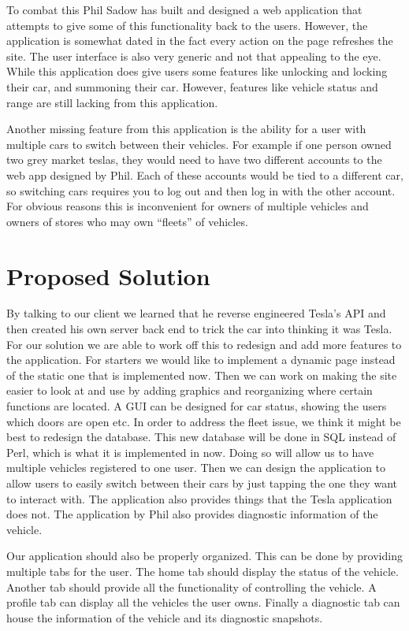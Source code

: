 \documentclass[draftclsnofoot, onecolumn, compsoc, 10pt]{IEEEtran}
\begin{document}
To combat this Phil Sadow has built and designed a web application that attempts to give some of this functionality back to the users. However, the application is somewhat dated in the fact every action on the page refreshes the site. The user interface is also very generic and not that appealing to the eye. While this application does give users some features like unlocking and locking their car, and summoning their car. However, features like vehicle status and range are still lacking from this application. 

Another missing feature from this application is the ability for a user with multiple cars to switch between their vehicles. For example if one person owned two grey market teslas, they would need to have two different accounts to the web app designed by Phil. Each of these accounts would be tied to a different car, so switching cars requires you to log out and then log in with the other account. For obvious reasons this is inconvenient for owners of multiple vehicles and owners of stores who may own “fleets” of vehicles.  
   
 
 \section{Proposed Solution} 
By talking to our client we learned that he reverse engineered Tesla’s API and then created his own server back end to trick the car into thinking it was Tesla. For our solution we are able to work off this to redesign and add more features to the application. For starters we would like to implement a dynamic page instead of the static one that is implemented now. Then we can work on making the site easier to look at and use by adding graphics and reorganizing where certain functions are located. A GUI can be designed for car status, showing the users which doors are open etc. In order to address the fleet issue, we think it might be best to redesign the database. This new database will be done in SQL instead of Perl, which is what it is implemented in now. Doing so will allow us to have multiple vehicles registered to one user. Then we can design the application to allow users to easily switch between their cars by just tapping the one they want to interact with. The application also provides things that the Tesla application does not. The application by Phil also provides diagnostic information of the vehicle.

Our application should also be properly organized. This can be done by providing multiple tabs for the user. The home tab should display the status of the vehicle. Another tab should provide all the functionality of controlling the vehicle. A profile tab can display all the vehicles the user owns. Finally a diagnostic tab can house the information of the vehicle and its diagnostic snapshots.
\end{document}
